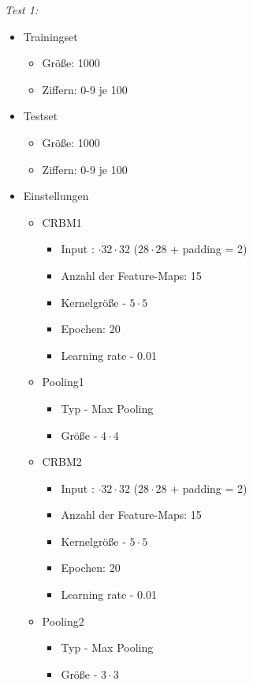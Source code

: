 \textit{Test 1:}
\begin{itemize}
\item Trainingset
    \begin{itemize}
        \item Größe: 1000
        \item Ziffern: 0-9 je 100
    \end{itemize}
\item Testset
    \begin{itemize}
        \item Größe: 1000
        \item Ziffern: 0-9 je 100
    \end{itemize}
\item Einstellungen
    \begin{itemize}
        \item CRBM1
            \begin{itemize}
                \item Input : $\cdot 32 \cdot 32$ ($28 \cdot  28$ + padding = 2) 
                \item Anzahl der Feature-Maps: 15
                \item Kernelgröße - $5 \cdot 5$
                \item Epochen: 20
                \item Learning rate - 0.01
            \end{itemize}
        \item Pooling1
            \begin{itemize}
                \item Typ - Max Pooling
                \item Größe - $4 \cdot 4$
            \end{itemize}
        \item CRBM2
            \begin{itemize}
                \item Input : $\cdot 32 \cdot 32$ ($28 \cdot  28$ + padding = 2) 
                \item Anzahl der Feature-Maps: 15
                \item Kernelgröße - $5 \cdot 5$
                \item Epochen: 20
                \item Learning rate - 0.01
            \end{itemize}
        \item Pooling2
            \begin{itemize}
                \item Typ - Max Pooling
                \item Größe - $3 \cdot 3$
            \end{itemize}
    \end{itemize}
\end{itemize}

